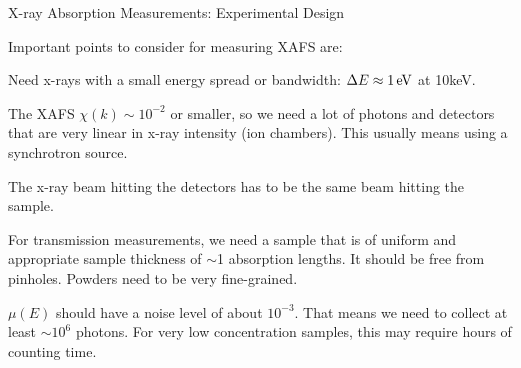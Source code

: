 
\begin{slide}{X-ray Absorption Measurements: Experimental Design}

Important points to consider for measuring XAFS are:

\vmm

    \begin{description}
    \pause \item[{\RedEmph{Monochromatic x-rays:}}] Need x-rays with a small energy
      spread or bandwidth: ${\Delta E \approx 1 \rm\, eV}$ at 10keV.
      
    \pause \item[{\RedEmph{Linear Detectors:}}] The XAFS ${\chi(k) \sim
        10^{-2}}$ or smaller, so we need a lot of photons and detectors
      that are very linear in x-ray intensity (ion chambers).  This usually
      means using a synchrotron source.
      
    \pause \item[{\RedEmph{Well-aligned Beam:}}] The x-ray beam hitting the
      detectors has to be the same beam hitting the sample.
   
    \pause \item[{\RedEmph{Homogeneous sample:}}] For transmission measurements,
      we need a sample that is of uniform and appropriate sample thickness
      of {$\sim$}1 absorption lengths.  It should be free from pinholes.
      Powders need to be very fine-grained.

    \pause \item[{\RedEmph{Counting Statistics:}}]
    ${\mu(E)}$ should have a noise level of about
    ${10^{-3}}$.  That means we need to collect at least
    ${\sim 10^6}$ photons.   For very low concentration samples, this may
    require hours of counting time.
% 
% 
% 
%         
%         

    \end{description}

\vfill
\end{slide} 
